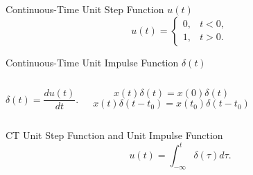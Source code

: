\begin{frame}[plain]{Continuous-Time Unit Step Function $u(t)$}
    \begin{equation}
        u(t) = \begin{cases}
                 0, & t < 0,\\
                 1, & t>0.
               \end{cases}
    \end{equation}
    {
        {
            \centering
            
        }
    }
\end{frame}



\begin{frame}[plain]{Continuous-Time Unit Impulse Function $\delta(t)$}
    \begin{columns}[t]
        {
            {
                {
                    \centering
                    
                }
            }
        }
        {
            \begin{equation}
                \delta(t) = \frac{du(t)}{dt}.
            \end{equation}
            {
                {
                    \centering
                    
                }
                \begin{equation*}
                    x(t)\delta(t) = x(0)\delta(t)
                \end{equation*}
                \begin{equation*}
                    x(t)\delta(t -t_0) = x(t_0)\delta(t-t_0)
                \end{equation*}

            }
        }
    \end{columns}




\end{frame}

\begin{frame}[plain]{CT Unit Step Function and Unit Impulse Function}
    \begin{equation}
        u(t) = \int_{-\infty}^{t}\delta(\tau)d\tau.
    \end{equation}
        {
            {
                \centering
                
            }
        }
\end{frame}



